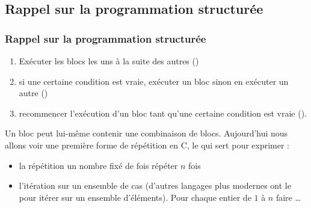 \documentclass[xcolor=pdftex,svgnames,table]{beamer}
\begin{document}
\subsection{Rappel sur la programmation structurée}


\begin{frame}
  \frametitle{Rappel sur la programmation structurée \nowrite}
    \begin{enumerate}
    \item Exécuter les blocs les uns à la suite des autres ()
    \item si une certaine condition est vraie, exécuter un bloc sinon
      en exécuter un autre ()
    \item recommencer l'exécution d'un bloc tant qu'une certaine
      condition est vraie ().
    \end{enumerate}
    Un bloc peut lui-même contenir une combinaison de blocs.
\pause
Aujourd'hui nous allons voir une première forme de répétition en C, le
 qui sert pour exprimer \youwrite:
\begin{itemize}
  \item la répétition un nombre fixé de fois \alert{répéter $n$ fois}
  \item l'itération sur un ensemble de cas (d'autres langages plus
    modernes ont le      pour itérer sur un ensemble
    d'éléments). \alert{Pour chaque entier de $1$ à $n$ faire \ldots}
\end{itemize}
\end{frame}
\end{document}
